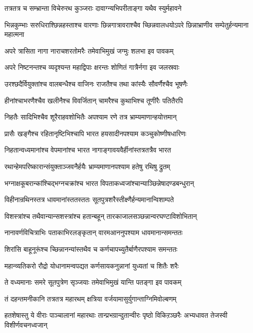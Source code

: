 \twolineshloka
{तत्रतत्र च सम्भ्रान्ता विचेरुरथ कुञ्जराः}
{दावाग्न्यभिपरीताङ्गा यथैव स्युर्महावने}


\threelineshloka
{भिन्नकुम्भाः सरुधिराश्छिन्नहस्ताश्च वारणाः}
{छिन्नगात्रावराश्चैव च्छिन्नवालधयोऽपरे}
{छिन्नाभ्राणीव सम्पेतुर्हन्यमाना महात्मना}


\twolineshloka
{अपरे त्रासिता नागा नाराचशरतोमरैः}
{तमेवाभिमुखं जग्मुः शलभा इव पावकम्}


\twolineshloka
{अपरे निष्टनन्तश्च व्यदृश्यन्त महाद्विपाः}
{क्षरन्तः शोणितं गात्रैर्नगा इव जलस्रवाः}


\twolineshloka
{उरश्छदैर्वियुक्तांश्च वालबन्धैश्च वाजिनः}
{राजतैश्च तथा कांस्यैः सौवर्णैश्चैव भूषणैः}


\twolineshloka
{हीनांश्चाभरणैश्चैव खलीनैश्च विवर्जितान्}
{चामरैश्च कुथाभिश्च तूणीरैः पतितैरपि}


\twolineshloka
{निहतैः सादिभिश्चैव शूरैराहवशोभितैः}
{अपश्याम रणे तत्र भ्राम्यमाणान्हयोत्तमान्}


\twolineshloka
{प्रासैः खङ्गैश्च रहितानृष्टिभिश्चापि भारत}
{हयसादीनपश्याम कञ्चुकोष्णीषधारिणः}


\twolineshloka
{निहतान्वध्यमानांश्च वेपमानांश्च भारत}
{नागाङ्गावयवैर्हीनांस्तत्रतत्रैव भारत}


\twolineshloka
{रथान्हेमपरिष्कारान्संयुक्ताञ्जवनैर्हयैः}
{भ्राम्यमाणानपश्याम हतेषु रथिषु द्रुतम्}


\twolineshloka
{भग्नाक्षकूबरान्कांश्चिद्भग्नचक्रांश्च भारत}
{विपताकध्वजांश्चान्याञ्छिन्नेषादण्डबन्धुरान्}


\twolineshloka
{विहीनान्रथिनस्तत्र धावमानांस्ततस्ततः}
{सूतपुत्रशरैस्तीक्ष्णैर्हन्यमानान्विशाम्पते}


\twolineshloka
{विशस्त्रांश्च तथैवान्यान्सशस्त्रांश्च हतान्बहून्}
{तारकाजालसञ्छन्नान्वरघण्टाविशोभितान्}


\twolineshloka
{नानावर्णविचित्राभिः पताकाभिरलङ्कृतान्}
{वारमआननुपश्याम धावमानान्समन्ततः}


\twolineshloka
{शिरांसि बाहूनूरूंश्च च्छिन्नानन्यांस्तथैव च}
{कर्णचापच्युतैर्बाणैरपश्याम समन्ततः}


\twolineshloka
{महान्व्यतिकरो रौद्रो योधानामन्वपद्यत}
{कर्णसायकनुन्नानां युध्यतां च शितैः शरैः}


\twolineshloka
{ते वध्यमानाः समरे सूतपुत्रेण सृञ्जयाः}
{तमेवाभिमुखं यान्ति पतङ्गा इव पावकम्}


\twolineshloka
{तं दहन्तमनीकानि तत्रतत्र महारथम्}
{क्षत्रिया वर्जयामासुर्युगान्ताग्निमिवोल्बणम्}


\threelineshloka
{हतशेषास्तु ये वीराः पाञ्चालानां महारथाः}
{तान्प्रभग्रान्दुतान्वीरः पृष्ठो विकिऱञ्छरैः}
{अभ्यधावत तेजस्वी विशीर्णवचनध्वजान्}


